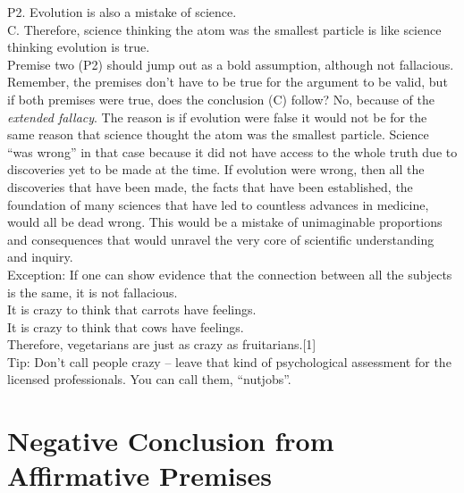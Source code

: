 \documentclass[a4paper,12pt,single,pdftex]{scrartcl}
\begin{document}
    
      P2. Evolution is also a mistake of science.
    \\

    
      C. Therefore, science thinking the atom was the smallest particle is like science thinking evolution is true.
    \\

    
      Premise two (P2) should jump out as a bold assumption, although not fallacious.  Remember, the premises don’t have to be true for the argument to be valid, but if both premises were true, does the conclusion (C) follow?  No, because of the {\it extended fallacy}.  The reason is if evolution were false it would not be for the same reason that science thought the atom was the smallest particle.  Science “was wrong” in that case because it did not have access to the whole truth due to discoveries yet to be made at the time.  If evolution were wrong, then all the discoveries that have been made, the facts that have been established, the foundation of many sciences that have led to countless advances in medicine, would all be dead wrong.  This would be a mistake of unimaginable proportions and consequences that would unravel the very core of scientific understanding and inquiry.
    \\

    
      Exception: If one can show evidence that the connection between all the subjects is the same, it is not fallacious.
    \\

    
      It is crazy to think that carrots have feelings.
    \\

    
      It is crazy to think that cows have feelings.
    \\

    
      Therefore, vegetarians are just as crazy as fruitarians.[1]
    \\

    
      Tip: Don’t call people crazy -- leave that kind of psychological assessment for the licensed professionals.  You can call them, “nutjobs”.
    \\

    \section{
      Negative Conclusion from Affirmative Premises
    }
  
    

    
      
\end{document}
